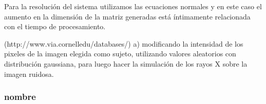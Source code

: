 
\par Para la resolución del sistema utilizamos las ecuaciones normales y en este caso el aumento en la dimensión de la matriz generadas está íntimamente relacionada con el tiempo de procesamiento.



(http://www.via.cornelledu/databases/)
a) modificando la intensidad de los pixeles de la imagen elegida como sujeto, utilizando valores aleatorios con distribución gaussiana, para luego hacer la simulación de los rayos X sobre la imagen ruidosa.


\subsubsection*{nombre}
